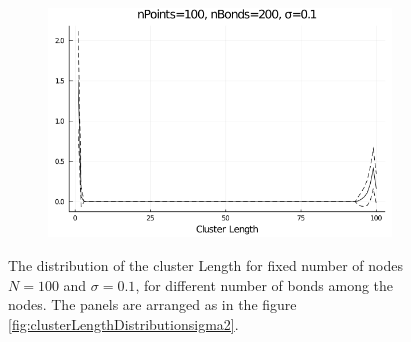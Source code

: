 \begin{figure}
\begin{subfigure}{0.32\textwidth}
		\includegraphics[width=\textwidth]{figures/ClusterLengthDistributionWithNBonds/sigma0.1/clusterLengthDistribution_nPoints100 nBonds200 sigma0.1.png}
	\end{subfigure}
	\caption{The distribution of the cluster Length for fixed number of nodes $N=100$ and  $\sigma=0.1$, for different number of bonds among the nodes. The panels are arranged as in the figure \ref{fig:clusterLengthDistributionsigma2}.}
	\label{fig:clusterLengthDistributionsigma0.1}
\end{figure}


